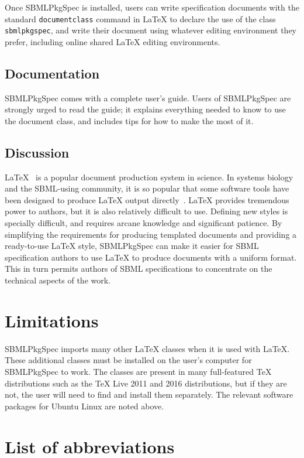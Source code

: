 \documentclass{bmcart}
\newcommand{\sbmlpkg}{SBMLPkgSpec}
\begin{document}
Once \sbmlpkg{} is installed, users can write specification documents with the standard \texttt{documentclass} command in LaTeX to declare the use of the class \texttt{sbmlpkgspec}, and write their document using whatever editing environment they prefer, including online shared LaTeX editing environments.


\subsection*{Documentation}

\sbmlpkg{} comes with a complete user's guide.  Users of \sbmlpkg{} are strongly urged to read the guide; it explains everything needed to know to use the document class, and includes tips for how to make the most of it.  


\subsection*{Discussion}

LaTeX~\cite{lamport1994} is a popular document production system in science.  In systems biology and the SBML-using community, it is so popular that some software tools have been designed to produce LaTeX output directly~\cite{drager2009sbml2latex, shen2010sbml2tikz}.  LaTeX provides tremendous power to authors, but it is also relatively difficult to use.  Defining new styles is specially difficult, and requires arcane knowledge and significant patience.  By simplifying the requirements for producing templated documents and providing a ready-to-use LaTeX style, \sbmlpkg{} can make it easier for SBML specification authors to use LaTeX to produce documents with a uniform format.  This in turn permits authors of SBML specifications to concentrate on the technical aspects of the work.


\section*{Limitations}

\sbmlpkg{} imports many other LaTeX classes when it is used with LaTeX. These additional classes must be installed on the user's computer for \sbmlpkg{} to work.  The classes are present in many full-featured TeX distributions such as the TeX Live 2011 and 2016 distributions, but if they are not, the user will need to find and install them separately. The relevant software packages for Ubuntu Linux are noted above.


\section*{List of abbreviations}
\end{document}
